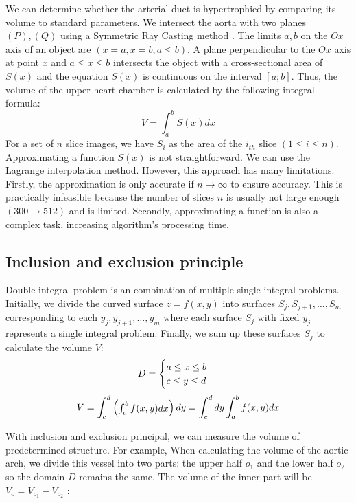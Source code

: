 \documentclass[11pt]{article}
\begin{document}
\begin{multicols}{2}
We can determine whether the arterial duct is hypertrophied by comparing its volume to standard parameters. We intersect the aorta with two planes $(P), (Q)$ using a Symmetric Ray Casting method \cite{vascular}. The limits $a,b$ on the $Ox$ axis of an object are $(x=a, x=b, a \leq b)$. A plane perpendicular to the $Ox$ axis at point $x$ and $a \leq x \leq b$ intersects the object with a cross-sectional area of $S(x)$ and the equation $S(x)$  is continuous on the interval $[a;b]$. Thus, the volume of the upper heart chamber is calculated by the following integral formula:
$$
V = \int_{a}^{b} S(x)dx
$$
For a set of $n$ slice images, we have $S_i$ as the area of the $i_{th}$ slice $(1 \leq i \leq n)$. Approximating a function $S(x)$ is not straightforward. We can use the Lagrange interpolation method. However, this approach has many limitations. Firstly, the approximation is only accurate if $n \rightarrow \infty$ to ensure accuracy. This is practically infeasible because the number of slices $n$ is usually not large enough $(300 \rightarrow 512)$ and is limited. Secondly, approximating a function is also a complex task, increasing algorithm's processing time.

\subsection{Inclusion and exclusion principle}
Double integral problem is an combination of multiple single integral problems. Initially, we divide the curved surface $z=f(x,y)$ into surfaces $S_j, S_{j+1}, \dots, S_m$ corresponding to each $y_j,  y_{j+1}, \dots, y_m$ where each surface $S_j$ with fixed $y_j$ represents a single integral problem. Finally, we sum up these surfaces $S_j$ to calculate the volume $V$: 
$$
D = \begin{cases} a \leq x \leq b \\ c \leq y \leq d \end{cases} \\
$$
$$
V =  \int_{c}^{d} \begin{pmatrix} \int_{a}^{b} f(x,y)dx \end{pmatrix} dy = \int_{c}^{d} dy \int_{a}^{b} f(x,y)dx \space
$$

With inclusion and exclusion principal, we can measure the volume of predetermined structure. For example, When calculating the volume of the aortic arch, we divide this vessel into two parts: the upper half $o_1$ and the lower half $o_2$ so the domain $D$ remains the same. The volume of the inner part will be $V_o = V_{o_1} - V_{o_2}$ :


\end{multicols}
\end{document}
